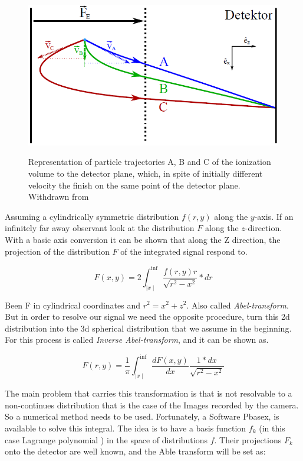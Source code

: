 \begin{figure}[h!]

\caption{Representation of particle trajectories A, B and C of the ionization volume to the detector plane, which, in spite of initially different velocity the finish on the same point of the detector plane. Withdrawn from \cite{fechner_lutz_aufbau_2011}}
\centering
\includegraphics[width=8 cm]{../Images/cel distrub vmi.png}
\label{ing:vmiVelcDist}
\end{figure}

Assuming a cylindrically symmetric distribution $f(r,y)$ along the $y$-axis. If an infinitely far away observant look at the distribution $F$ along the $z$-direction.  With a basic axis conversion it can be shown that along the Z direction, the projection of the distribution $F$ of the integrated signal respond to.

\begin{equation}
F(x,y)=2\int^{\inf}_{\mid x\mid} \dfrac{f(r,y)r}{\sqrt{r^{2}-x^{2}}}*dr 
\end{equation}

Been F in cylindrical coordinates and $r^{2}=x^{2}+z^{2}$. Also called \textit{Abel-transform}.
But in order to resolve our signal we need the opposite procedure, turn this 2d distribution into the 3d spherical distribution that we assume in the beginning. For this process is called \textit{Inverse Abel-transform}, and it can be shown as.
 
\begin{equation}
F(r,y)=\dfrac{1}{\pi} \int^{\inf}_{\mid x\mid} \dfrac{dF(x,y)}{dx} \dfrac{1*dx}{\sqrt{r^{2}-x^{2}}} 
\end{equation}

The main problem that carries this transformation is that is not resolvable to a non-continues distribution that is the case of the Images recorded by the camera. So a numerical method needs to be used.
Fortunately, a Software Pbasex, is available to solve this integral. The idea is to have a basis function $f_{k}$ (in this case Lagrange polynomial ) in the space of distributions $f$.  Their projections $F_{k}$ onto the detector are well known, and the Able transform will be set as:

